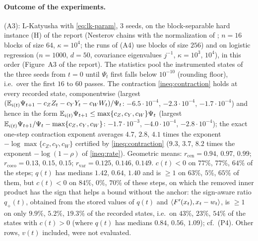 \paragraph{Outcome of the experiments.} (A3): L-Katyusha with \eqref{eq:lk-param}, 3 seeds, on the block-separable hard instance (H) of the report (Nesterov chains with the normalization of \cite{lan2018optimal}; $n=16$ blocks of size $64$, $\kappa=10^4$; the runs of (A4) use blocks of size $256$) and on logistic regression ($n=1000$, $d=50$, covariance eigenvalues $j^{-1}$, $\kappa=10^3$, $10^4$), in this order (Figure~A3 of the report). The statistics pool the instrumented states of the three seeds from $t=0$ until $\Psi_t$ first falls below $10^{-10}$ (rounding floor), i.e.\ over the first $16$ to $60$ passes. The contraction \eqref{ineq:contraction} holds at every recorded state, componentwise (largest $(\mathbb{E}_{i(t)}\Psi_{t+1}-c_ZZ_t-c_YY_t-c_WW_t)/\Psi_t$: $-6.5\cdot10^{-4}$, $-2.3\cdot10^{-4}$, $-1.7\cdot10^{-4}$) and hence in the form $\mathbb{E}_{i(t)}\Psi_{t+1}\le\max\{c_Z,c_Y,c_W\}\Psi_t$ (largest $\mathbb{E}_{i(t)}\Psi_{t+1}/\Psi_t-\max\{c_Z,c_Y,c_W\}$: $-1.7\cdot10^{-3}$, $-4.0\cdot10^{-4}$, $-2.8\cdot10^{-4}$); the exact one-step contraction exponent averages $4.7$, $2.8$, $4.1$ times the exponent $-\log\max\{c_Z,c_Y,c_W\}$ certified by \eqref{ineq:contraction} ($9.3$, $3.7$, $8.2$ times the exponent $-\log(1-\rho)$ of \eqref{ineq:rate}). Geometric means: $r_{\mathrm{cen}}=0.94,\,0.97,\,0.99$; $r_{\mathrm{coco}}=0.13,\,0.15,\,0.15$; $r_{\mathrm{var}}=0.125,\,0.146,\,0.149$. $c(t)<0$ on $77\%$, $77\%$, $64\%$ of the steps; $q(t)$ has medians $1.42$, $0.64$, $1.40$ and is $\ge1$ on $63\%$, $5\%$, $65\%$ of them, but $c(t)<0$ on $84\%$, $0\%$, $70\%$ of these steps, on which the removed inner product has the sign that helps a bound without the anchor: the sign-aware ratio $q_+(t)$, obtained from the stored values of $q(t)$ and $\left\langle F'(x_t), x_t-w_t \right\rangle$, is $\ge1$ on only $9.9\%$, $5.2\%$, $19.3\%$ of the recorded states, i.e.\ on $43\%$, $23\%$, $54\%$ of the states with $c(t)>0$ (where $q(t)$ has medians $0.84$, $0.56$, $1.09$); cf.\ (P4). Other rows, $v(t)$ included, were not evaluated.

